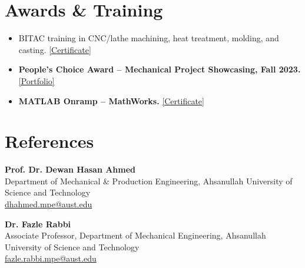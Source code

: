 \documentclass[11pt,a4paper]{article}
\newcommand{\cvlink}[2]{\href{#1}{\textnormal{\small[#2]}}}
\begin{document}
\section*{Awards \& Training}
\begin{itemize}
  \item BITAC training in CNC/lathe machining, heat treatment, molding, and casting.
  \cvlink{https://meherabhossen.pages.dev/\#credentials}{Certificate}
  \item \textbf{People's Choice Award -- Mechanical Project Showcasing, Fall 2023.}
  \cvlink{https://meherabhossen.pages.dev/\#achievements}{Portfolio}
  \item \textbf{MATLAB Onramp -- MathWorks.}
  \cvlink{https://meherabhossen.pages.dev/assets/img/matlab.png}{Certificate}
\end{itemize}

\section*{References}
\textbf{Prof. Dr. Dewan Hasan Ahmed}\\
Department of Mechanical \& Production Engineering, Ahsanullah University of Science and Technology\\
\href{mailto:dhahmed.mpe@aust.edu}{dhahmed.mpe@aust.edu}

\vspace{3pt}
\textbf{Dr. Fazle Rabbi}\\
Associate Professor, Department of Mechanical Engineering, Ahsanullah University of Science and Technology\\
\href{mailto:fazle.rabbi.mpe@aust.edu}{fazle.rabbi.mpe@aust.edu}
\end{document}
